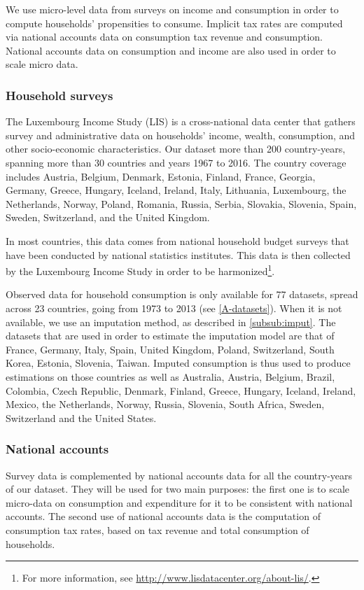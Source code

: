 \documentclass[12pt]{article}
\begin{document}
We use micro-level data from surveys on income and consumption in order to compute households' propensities to consume. Implicit tax rates are computed via national accounts data on consumption tax revenue and consumption. National accounts data on consumption and income are also used in order to scale micro data.

\subsubsection{Household surveys}
\label{sec:LISdata}
The Luxembourg Income Study (LIS) is a cross-national data center that gathers survey and administrative data on households' income, wealth, consumption, and other socio-economic characteristics. Our dataset more than 200 country-years, spanning more than 30 countries and years 1967 to 2016. The country coverage includes Austria, Belgium, Denmark, Estonia, Finland, France, Georgia, Germany, Greece, Hungary, Iceland, Ireland, Italy, Lithuania, Luxembourg, the Netherlands, Norway, Poland, Romania, Russia, Serbia, Slovakia, Slovenia, Spain, Sweden, Switzerland, and the United Kingdom. 

In most countries, this data comes from national household budget surveys that have been conducted by national statistics institutes. This data is then collected by the Luxembourg Income Study in order to be harmonized\footnote{For more information, see \url{http://www.lisdatacenter.org/about-lis/}.}.

Observed data for household consumption is only available for 77 datasets, spread across 23 countries, going from 1973 to 2013 (see \cref{A-datasets}). When it is not available, we use an imputation method, as described in \cref{subsub:imput}. The datasets that are used in order to estimate the imputation model are that of France, Germany, Italy, Spain, United Kingdom, Poland, Switzerland, South Korea, Estonia, Slovenia, Taiwan. Imputed consumption is thus used to produce estimations on those countries as well as Australia, Austria, Belgium, Brazil, Colombia, Czech Republic, Denmark, Finland, Greece, Hungary, Iceland, Ireland, Mexico, the Netherlands, Norway, Russia, Slovenia, South Africa, Sweden, Switzerland and the United States. 


\subsubsection{National accounts}
\label{subsub:data}
Survey data is complemented by national accounts data for all the country-years of our dataset. They will be used for two main purposes: the first one is to scale micro-data on consumption and expenditure for it to be consistent with national accounts. The second use of national accounts data is the computation of consumption tax rates, based on tax revenue and total consumption of households.
\end{document}
